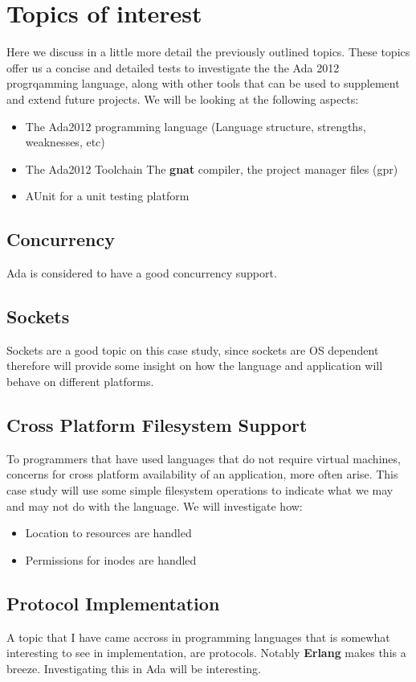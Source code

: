\section{Topics of interest}
Here we discuss in a little more detail the previously outlined topics. These topics offer us a concise and detailed tests to investigate the the Ada 2012 progrqamming language, along with other tools that can be used to supplement and extend future projects. We will be looking at the following aspects:
\begin{itemize}
\item{The Ada2012} programming language (Language structure, strengths, weaknesses, etc)
\item{The Ada2012 Toolchain} The \textbf{gnat} compiler, the project manager files (gpr)
\item{AUnit} for a unit testing platform
\end{itemize}

\subsection{Concurrency}
Ada is considered to have a good concurrency support. 

\subsection{Sockets}
Sockets are a good topic on this case study, since sockets are OS dependent
therefore will provide some insight on how the language and application will
behave on different platforms. 

\subsection{Cross Platform Filesystem Support}
To programmers that have used languages that do not require virtual machines, concerns for cross platform availability of an application, more often arise. This case study will use some simple filesystem operations to indicate what we may and may not do with the language. We will investigate how:
\begin{itemize}
  \item Location to resources are handled
  \item Permissions for inodes are handled
\end{itemize}

\subsection{Protocol Implementation}
A topic that I have came accross in programming languages that is somewhat
interesting to see in implementation, are protocols. Notably \textbf{Erlang} 
makes this a breeze. Investigating this in Ada will be interesting. 

